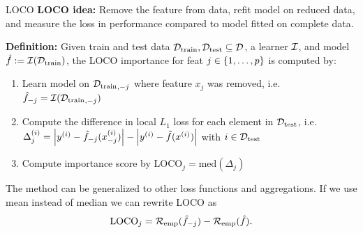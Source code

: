 \documentclass[10pt,compress,t,notes=noshow, xcolor=table]{beamer}
\begin{document}
\begin{frame}{LOCO  }
%
\textbf{LOCO idea:} Remove the feature from data, refit model on reduced data, and measure the loss in performance compared to model fitted on complete data. %

\pause\medskip

\textbf{Definition:} Given train and test data $\mathcal{D}_{\text{train}}, \mathcal{D}_{\text{test}} \subseteq \mathcal{D}$, a learner $\mathcal{I}$, and model $\hat{f} := \mathcal{I}(\mathcal{D}_{\text{train}})$, the LOCO importance for feat $j \in \{1, \ldots, p\}$ is computed by:

\medskip

  \begin{enumerate}
    \item Learn model on ${\mathcal{D}_{\text{train}}}_{,-j}$ where feature $x_j$ was removed, i.e. $\hat{f}_{-j} = \mathcal{I}({\mathcal{D}_{\text{train}}}_{,-j})$\pause
    \item Compute the difference in local $L_1$ loss for each element in $\mathcal{D}_{\text{test}}$, i.e. $\Delta_j^{(i)} = \left  |y^{(i)} - \hat{f}_{-j}(x_{-j}^{(i)}) \right | - \left |y^{(i)} - \hat{f}(x^{(i)}) \right | $ with $i \in \mathcal{D}_{\text{test}}$\pause
    \item Compute importance score by $\text{LOCO}_j = \text{med} \left ( \Delta_j  \right )$
  \end{enumerate}

\medskip\pause

The method can be generalized to other loss functions and aggregations. If we use mean instead of median we can rewrite LOCO as
%
$$ \text{LOCO}_j = \mathcal{R}_{\text{emp}}(\hat{f}_{-j}) - \mathcal{R}_{\text{emp}}(\hat{f}).$$
\end{frame}
\end{document}
